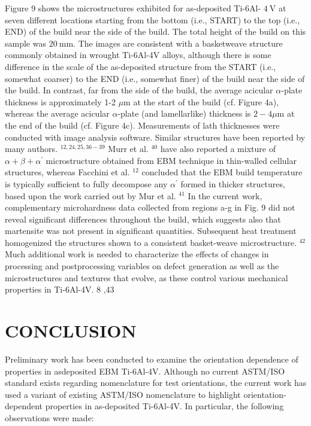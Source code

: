 \documentclass[10pt]{article}
\begin{document}
Figure 9 shows the microstructures exhibited for as-deposited Ti-6Al- $4 \mathrm{~V}$ at seven different locations starting from the bottom (i.e., START) to the top (i.e., END) of the build near the side of the build. The total height of the build on this sample was $20 \mathrm{~mm}$. The images are consistent with a basketweave structure commonly obtained in wrought Ti-6Al-4V alloys, although there is some difference in the scale of the as-deposited structure from the START (i.e., somewhat coarser) to the END (i.e., somewhat finer) of the build near the side of the build. In contrast, far from the side of the build, the average acicular $\alpha$-plate thickness is approximately 1-2 $\mu \mathrm{m}$ at the start of the build (cf. Figure 4a), whereas the average acicular $\alpha$-plate (and lamellarlike) thickness is $2-4 \mu \mathrm{m}$ at the end of the build (cf. Figure 4c). Measurements of lath thicknesses were conducted with image analysis software. Similar structures have been reported by many authors. ${ }^{12,24,25,36-39}$ Murr et al. ${ }^{40}$ have also reported a mixture of $\alpha+\beta+\alpha^{\prime}$ microstructure obtained from EBM technique in thin-walled cellular structures, whereas Facchini et al. ${ }^{12}$ concluded that the EBM build temperature is typically sufficient to fully decompose any $\alpha^{\prime}$ formed in thicker structures, based upon the work carried out by Mur et al. ${ }^{41}$ In the current work, complementary microhardness data collected from regions a-g in Fig. 9 did not reveal significant differences throughout the build, which suggests also that martensite was not present in significant quantities. Subsequent heat treatment homogenized the structures shown to a consistent basket-weave microstructure. ${ }^{42}$ Much additional work is needed to characterize the effects of changes in processing and postprocessing variables on defect generation as well as the microstructures and textures that evolve, as these control various mechanical properties in Ti-6Al-4V. 8 ,43

\section*{CONCLUSION}
Preliminary work has been conducted to examine the orientation dependence of properties in asdeposited EBM Ti-6Al-4V. Although no current ASTM/ISO standard exists regarding nomenclature for test orientations, the current work has used a variant of existing ASTM/ISO nomenclature to highlight orientation-dependent properties in as-deposited Ti-6Al-4V. In particular, the following observations were made:
\end{document}

